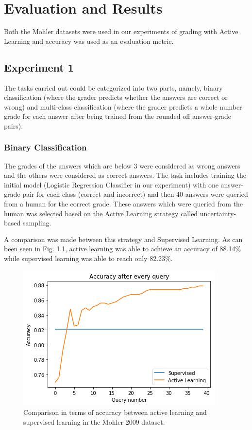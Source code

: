 
\chapter{Evaluation and Results}

Both the Mohler datasets were used in our experiments of grading with Active Learning and accuracy was used as an evaluation metric. 

\section{Experiment 1}

The tasks carried out could be categorized into two parts, namely, binary classification (where the grader predicts whether the answers are correct or wrong) and multi-class classification (where the grader predicts a whole number grade for each answer after being trained from the rounded off answer-grade pairs).

\subsection{Binary Classification}

The grades of the answers which are below 3 were considered as wrong answers and the others were considered as correct answers. The task includes training the initial model (Logistic Regression Classifier in our experiment) with one answer-grade pair for each class (correct and incorrect) and then 40 answers were queried from a human for the correct grade. These answers which were queried from the human was selected based on the Active Learning strategy called uncertainty-based sampling. 

A comparison was made between this strategy and Supervised Learning. As can been seen in Fig. \ref{m1_binary}, active learning was able to achieve an accuracy of 88.14\% while supervised learning was able to reach only 82.23\%.

\begin{figure}[h!]
	\centering
	\includegraphics[scale=0.7]{images/m1_binary}
	\caption{Comparison in terms of accuracy between active learning and supervised learning in the Mohler 2009 dataset.}
	\label{m1_binary}
\end{figure}


